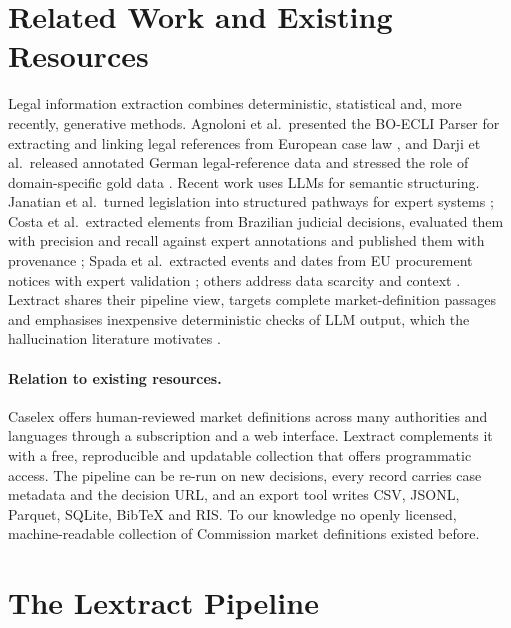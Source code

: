 \documentclass{IOS-Book-Article}
\begin{document}
\section{Related Work and Existing Resources}
\label{sec:related-work}

Legal information extraction combines deterministic, statistical and, more
recently, generative methods. Agnoloni et al.\ presented the BO-ECLI Parser for
extracting and linking legal references from European case law
\cite{agnoloni2017boecli}, and Darji et al.\ released annotated German
legal-reference data and stressed the role of domain-specific gold data
\cite{darji2023german}. Recent work uses LLMs for semantic structuring.
Janatian et al.\ turned legislation into structured pathways for expert systems
\cite{janatian2023text}; Costa et al.\ extracted elements from Brazilian
judicial decisions, evaluated them with precision and recall against expert
annotations and published them with provenance \cite{costa2024semantic}; Spada
et al.\ extracted events and dates from EU procurement notices with expert
validation \cite{spada2025expert}; others address data scarcity and context
\cite{nguyen2025data,bjbmmcmnthsktczmm2025,csfafemspsrdsc2024}. Lextract shares
their pipeline view, targets complete market-definition passages and
emphasises inexpensive deterministic checks of LLM output, which the
hallucination literature motivates \cite{ktanovssze2025}.

\paragraph{Relation to existing resources.} Caselex \cite{caselex} offers
human-reviewed market definitions across many authorities and languages through
a subscription and a web interface. Lextract complements it with a free,
reproducible and updatable collection that offers programmatic access. The
pipeline can be re-run on new decisions, every record carries case metadata and
the decision URL, and an export tool writes CSV, JSONL, Parquet, SQLite, BibTeX
and RIS. To our knowledge no openly licensed, machine-readable collection of
Commission market definitions existed before.

\section{The Lextract Pipeline}
\label{sec:pipeline}
\end{document}
